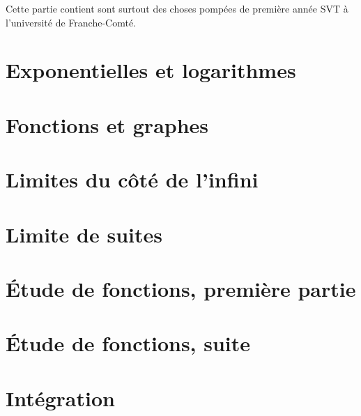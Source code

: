 
Cette partie contient sont surtout des choses pompées de première année SVT à l'université de Franche-Comté.




\section{Exponentielles et logarithmes}

\section{Fonctions et graphes}


\section{Limites du côté de l'infini}

\section{Limite de suites}


\section{Étude de fonctions, première partie}

\section{Étude de fonctions, suite}

\section{Intégration}


